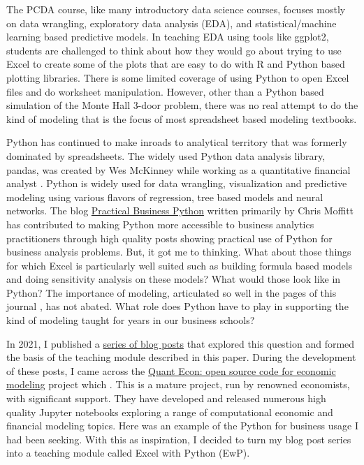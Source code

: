 \documentclass[ited,blindrev]{informs3}              %
\begin{document}
The PCDA course, like many introductory data science courses, focuses mostly on data wrangling, exploratory data analysis (EDA), and statistical/machine learning based predictive models. In teaching EDA using tools like ggplot2, students are challenged to think about how they would go about trying to use Excel to create some of the plots that are easy to do with R and Python based plotting libraries. There is some limited coverage of using Python to open Excel files and do worksheet manipulation. However, other than a Python based simulation of the Monte Hall 3-door problem, there was no real attempt to do the kind of modeling that is the focus of most spreadsheet based modeling textbooks. 

Python has continued to make inroads to analytical territory that was formerly dominated by spreadsheets. The widely used Python data analysis library, pandas, was created by Wes McKinney while working as a quantitative financial analyst \cite{PythonDataAnalysis}. Python is widely used for data wrangling, visualization and predictive modeling using various flavors of regression, tree based models and neural networks. The blog \href{https://pbpython.com/}{Practical Business Python} written primarily by Chris Moffitt has contributed to making Python more accessible to business analytics practitioners through high quality posts showing practical use of Python for business analysis problems. But, it got me to thinking. What about those things for which Excel is particularly well suited such as building formula based models and doing sensitivity analysis on these models? What would those look like in Python? The importance of modeling, articulated so well in the pages of this journal \cite{powellTeachingModelingManagement2001}, has not abated. What role does Python have to play in supporting the kind of modeling taught for years in our business schools?

In 2021, I published a \href{https://bitsofanalytics.org/#category=excel}{series of blog posts} that explored this question and formed the basis of the teaching module described in this paper. During the development of these posts, I came across the \href{https://quantecon.org/}{Quant Econ: open source code for economic modeling} project which . This is a mature project, run by renowned economists, with significant support. They have developed and released numerous high quality Jupyter notebooks exploring a range of computational economic and financial modeling topics. Here was an example of the Python for business usage I had been seeking. With this as inspiration, I decided to turn my blog post series into a teaching module called Excel with Python (EwP). 
\end{document}

